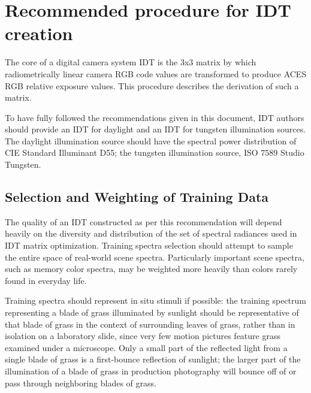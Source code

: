 \regularsectionformat
\chapter{Recommended procedure for IDT creation}

\label{chap:procedure}

The core of a digital camera system IDT is the 3x3 matrix by which radiometrically linear camera RGB code values are transformed to produce ACES RGB relative exposure values. This procedure describes the derivation of such a matrix.

To have fully followed the recommendations given in this document, IDT authors should provide an IDT for daylight and an IDT for tungsten illumination sources. The daylight illumination source should have the spectral power distribution of CIE Standard Illuminant D55; the tungsten illumination source, ISO 7589 Studio Tungsten.


\section{Selection and Weighting of Training Data}
The quality of an IDT constructed as per this recommendation will depend heavily on the diversity and distribution of the set of spectral radiances used in IDT matrix optimization. Training spectra selection should attempt to sample the entire space of real-world scene spectra. Particularly important scene spectra, such as memory color spectra, may be weighted more heavily than colors rarely found in everyday life.

Training spectra should represent in situ stimuli if possible: the training spectrum representing a blade of grass illuminated by sunlight should be representative of that blade of grass in the context of surrounding leaves of grass, rather than in isolation on a laboratory slide, since very few motion pictures feature grass examined under a microscope. Only a small part of the reflected light from a single blade of grass is a first-bounce reflection of sunlight; the larger part of the illumination of a blade of grass in production photography will bounce off of or pass through neighboring blades of grass.

